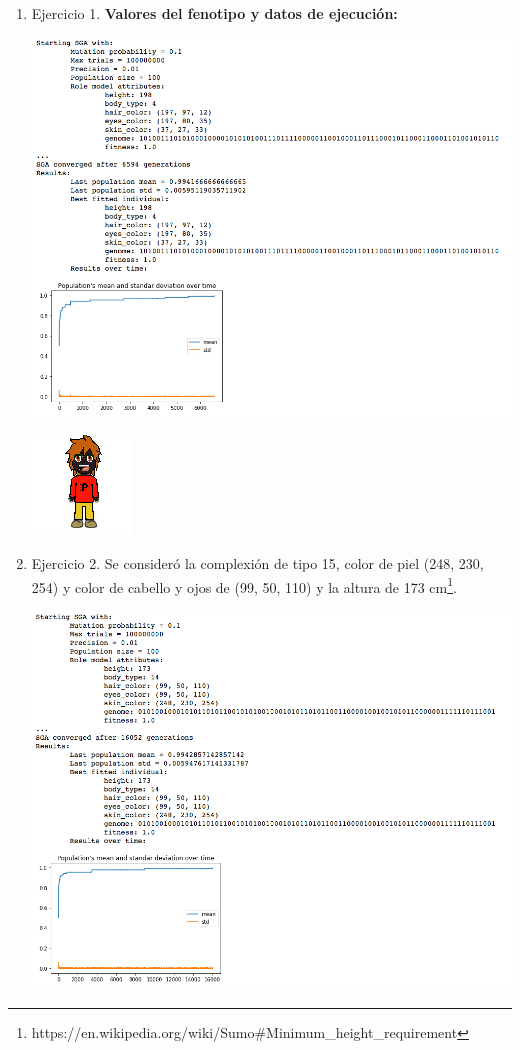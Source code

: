 \documentclass[10pt,letterpaper]{article}
\begin{document}
\begin{enumerate}
    \item Ejercicio 1. \textbf{Valores del fenotipo y datos de ejecución:}
        \begin{center}\includegraphics[scale=0.5]{./assets/EX1Results.png}\end{center}
        \begin{center}\includegraphics[scale=1]{./assets/EX1Avatar.png}\end{center}
    \clearpage
    \item Ejercicio 2. Se consideró la complexión de tipo 15, color de piel (248, 230, 254)
          y color de cabello y ojos de (99, 50, 110) y la
          altura de 173 cm\footnote{https://en.wikipedia.org/wiki/Sumo\#Minimum\_height\_requirement}.
        \begin{center}\includegraphics[scale=0.5]{./assets/EX2Results.png}\end{center}

\end{enumerate}
\end{document}
